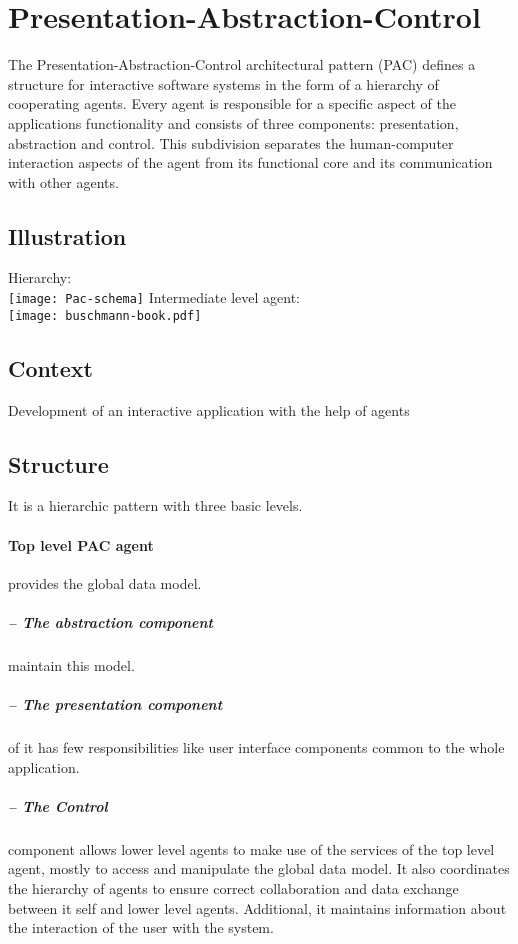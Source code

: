 \documentclass[a4paper,11pt,twocolumn]{report}
\begin{document}
    \section{Presentation-Abstraction-Control}
    The Presentation-Abstraction-Control architectural pattern (PAC) defines a
    structure for interactive software systems in the form of a hierarchy of
    cooperating agents. Every agent is responsible for a specific aspect of the
    applications functionality and consists of three components: presentation,
    abstraction and control. This subdivision separates the human-computer
    interaction aspects of the agent from its functional core and its
    communication with other agents.
    \subsection{Illustration}
    Hierarchy:\\
    \texttt{[image: Pac-schema]}
    Intermediate level agent:\\
    \texttt{[image: buschmann-book.pdf]}
    \subsection{Context}
    Development of an interactive application with the help of agents
    \subsection{Structure}
    It is a hierarchic pattern with three basic levels.
    \paragraph{Top level PAC agent} provides the global data model.
    \subparagraph{-- The abstraction component} maintain this model.
    \subparagraph{-- The presentation component}
    of it has few responsibilities like user interface
    components common to the whole application. 
    \subparagraph{-- The Control} component allows
    lower level agents to make use of the services of the top level agent,
    mostly to access and manipulate the global data model. It also coordinates
    the hierarchy of agents to ensure correct collaboration and data exchange
    between it self and lower level agents. Additional, it maintains
    information about the interaction of the user with the system.
\end{document}
